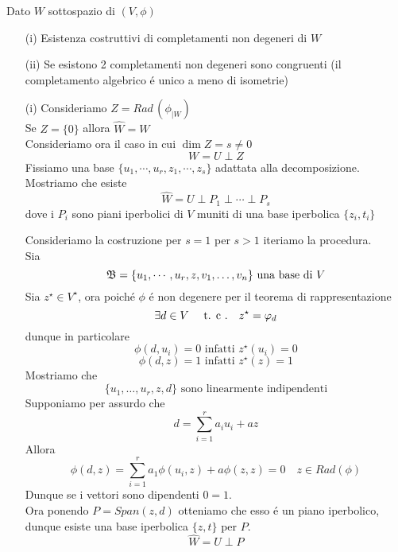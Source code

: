 \begin{thm}\bianco
Dato $W $ sottospazio di $(V,\phi) $
\begin{itemize}
\item[(i)]Esistenza costruttivi di completamenti non degeneri di $W$
\item[(ii)]Se esistono 2 completamenti non degeneri sono congruenti (il completamento algebrico \'e unico a meno di isometrie)
\end{itemize}
\proof \bianco
\begin{itemize}
\item[(i)]Consideriamo $Z=Rad \,\left( \phi_{\vert W } \right) $\\
Se $Z=\{ 0\} $ allora $\hat{W}=W $\\
Consideriamo ora il caso in cui $\dim Z= s \neq 0 $ 
$$ W = U \perp Z $$
Fissiamo una base $\{ u_1, \cdots , u_r , z_1 , \cdots , z_s \} $ adattata alla decomposizione.\\
Mostriamo che esiste 
$$ \hat{W}=U \perp P_1 \perp \cdots \perp P_s $$ 
dove i $P_i$ sono piani iperbolici di $V$ muniti di una base iperbolica $\{ z_i , t_i \} $

Consideriamo la costruzione per $s=1$ per $s>1$ iteriamo la procedura.\\
Sia $$\mathfrak{B} =\{ u_1, \cdots , u_r, z , v_1, \dots, v_n \}  \text{  una base di } V$$
Sia $z^\star \in  V^\star$, ora poich\'e $\phi$ \'e non degenere per il teorema di rappresentazione
$$ \exists d \in V \quad \text{ t. c .} \quad z^\star= \varphi_d $$ 
dunque in particolare
$$ \phi(d,u_i)= 0 \text{ infatti } z^\star (u_i)= 0 $$ 
$$ \phi(d,z)= 1 \text{ infatti } z^\star (z)=1 $$ 
Mostriamo che 
$$ \{ u_1, \dots, u_r,z,d \} \text{ sono linearmente indipendenti}$$ 
Supponiamo per assurdo che
$$ d = \sum_{i=1}^r a_i u_i + az $$
Allora
$$ \phi ( d,z) =  \sum_{i=1}^r a_1 \phi(u_i,z) + a \phi(z,z)=0 \quad z \in Rad(\phi)$$
Dunque se i vettori sono dipendenti $0=1$.\\
Ora ponendo $P=Span(z,d)$ otteniamo che esso \'e un piano iperbolico, dunque esiste una base iperbolica $\{ z, t \}$ per $P$.
$$ \hat{W}=U \perp P $$
\spazio


\end{itemize}
\end{thm}
